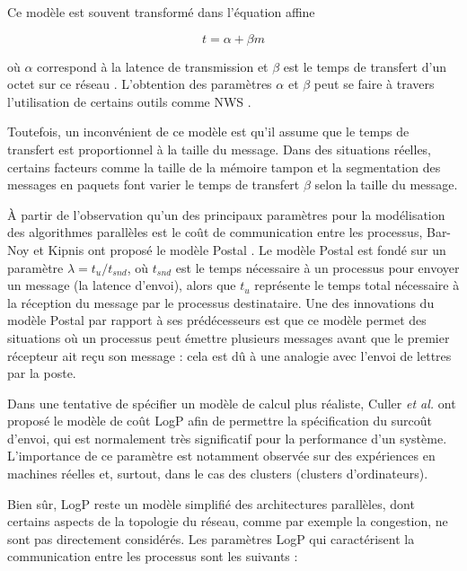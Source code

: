 Ce modèle est souvent transformé dans l'équation affine 

\[
t=\alpha+\beta m\]


où $\alpha$ correspond à la latence de transmission et $\beta$ est
le temps de transfert d'un octet sur ce réseau \cite{Pjesivac-Grbovic05}.
L'obtention des paramètres $\alpha$ et $\beta$ peut se faire à travers
l'utilisation de certains outils comme NWS \cite{Wolski97}. 

Toutefois, un inconvénient de ce modèle est qu'il assume que le temps
de transfert est proportionnel à la taille du message. Dans des situations
réelles, certains facteurs comme la taille de la mémoire tampon et
la segmentation des messages en paquets font varier le temps de transfert
$\beta$ selon la taille du message. 

À partir de l'observation qu'un des principaux paramètres pour la
modélisation des algorithmes parallèles est le coût de communication
entre les processus, Bar-Noy et Kipnis ont proposé le modèle Postal
\cite{Bar-Noy94}. Le modèle Postal est fondé sur un paramètre $\lambda=t_{u}/t_{snd}$,
où $t_{snd}$ est le temps nécessaire à un processus pour envoyer
un message (la latence d'envoi), alors que $t_{u}$ représente le
temps total nécessaire à la réception du message par le processus
destinataire. Une des innovations du modèle Postal par rapport à ses
prédécesseurs est que ce modèle permet des situations où un processus
peut émettre plusieurs messages avant que le premier récepteur ait reçu
son message : cela est dû à une analogie avec l'envoi de lettres par
la poste. 

%
Dans une tentative de spécifier un modèle de calcul plus réaliste,
Culler \emph{et al.} \cite{Culler96} ont proposé le modèle de coût
LogP afin de permettre la spécification du surcoût d'envoi, qui
est normalement très significatif pour la performance d'un système.
L'importance de ce paramètre est notamment observée sur des expériences
en machines réelles et, surtout, dans le cas des clusters (clusters d'ordinateurs). 


Bien sûr, LogP reste un modèle simplifié des architectures parallèles,
dont certains aspects de la topologie du réseau, comme par exemple
la congestion, ne sont pas directement considérés. Les paramètres LogP qui caractérisent
la communication entre les processus sont les suivants : 

